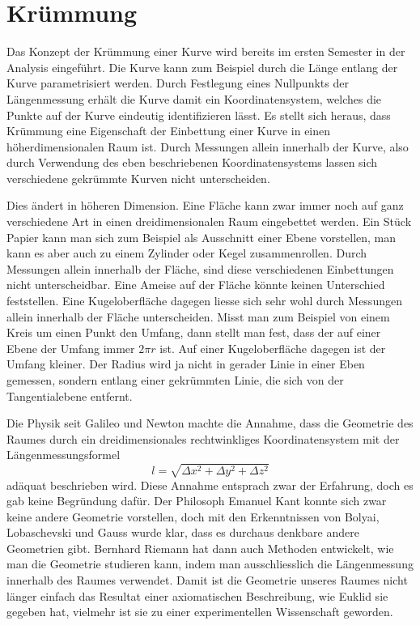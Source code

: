 %
%
%
\chapter{Krümmung\label{skript:chapter:kruemmung}}
\rhead{}
Das Konzept der Krümmung einer Kurve wird bereits im ersten Semester
in der Analysis eingeführt.
Die Kurve kann zum Beispiel durch die Länge entlang der Kurve
parametrisiert werden.
Durch Festlegung eines Nullpunkts der Längenmessung erhält die
Kurve damit ein Koordinatensystem, welches die Punkte auf der
Kurve eindeutig identifizieren lässt.
Es stellt sich heraus, dass Krümmung eine Eigenschaft der Einbettung
einer Kurve in einen höherdimensionalen Raum ist.
Durch Messungen allein innerhalb der Kurve, also durch Verwendung
des eben beschriebenen Koordinatensystems lassen sich verschiedene
gekrümmte Kurven nicht unterscheiden.

Dies ändert in höheren Dimension.
Eine Fläche kann zwar immer noch auf ganz verschiedene Art in
einen dreidimensionalen Raum eingebettet werden.
Ein Stück Papier kann man sich zum Beispiel als Ausschnitt einer
Ebene vorstellen, man kann es aber auch zu einem Zylinder oder
Kegel zusammenrollen.
Durch Messungen allein innerhalb der Fläche, sind diese verschiedenen
Einbettungen nicht unterscheidbar.
Eine Ameise auf der Fläche könnte keinen Unterschied feststellen.
Eine Kugeloberfläche dagegen liesse sich sehr wohl durch Messungen
allein innerhalb der Fläche unterscheiden.
Misst man zum Beispiel von einem Kreis um einen Punkt den Umfang,
dann stellt man fest, dass der auf einer Ebene der Umfang immer $2\pi r$ ist.
Auf einer Kugeloberfläche dagegen ist der Umfang kleiner.
Der Radius wird ja nicht in gerader Linie in einer Eben gemessen,
sondern entlang einer gekrümmten Linie, die sich von der Tangentialebene
entfernt.

Die Physik seit Galileo und Newton machte die Annahme, dass die
Geometrie des Raumes durch ein dreidimensionales rechtwinkliges
Koordinatensystem mit der Längenmessungsformel
\begin{equation}
l=\sqrt{\Delta x^2+\Delta y^2+\Delta z^2}
\label{skript:kruemmung:pytagoras}
\end{equation}
adäquat beschrieben wird.
Diese Annahme entsprach zwar der Erfahrung, doch es gab keine
Begründung dafür.
Der Philosoph Emanuel Kant konnte sich zwar keine andere Geometrie
vorstellen, doch mit den Erkenntnissen von Bolyai, Lobaschevski
und Gauss wurde klar, dass es durchaus denkbare andere Geometrien
gibt.
Bernhard Riemann hat dann auch Methoden entwickelt, wie man die
Geometrie studieren kann, indem man ausschliesslich die Längenmessung
innerhalb des Raumes verwendet.
Damit ist die Geometrie unseres Raumes nicht länger einfach das
Resultat einer axiomatischen Beschreibung, wie Euklid sie gegeben hat,
vielmehr ist sie zu einer experimentellen Wissenschaft geworden.

